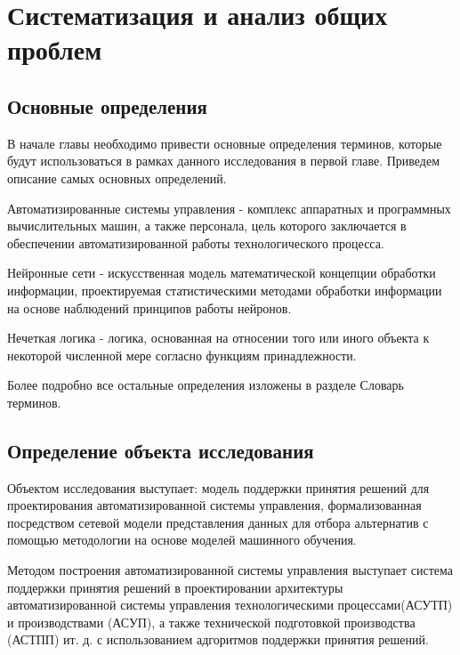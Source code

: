 \chapter{Систематизация и анализ общих проблем}\label{ch:ch1}

\section{Основные определения}\label{sec:ch1/sec1}

В начале главы необходимо привести основные определения терминов, которые будут использоваться в рамках данного исследования в первой главе. Приведем описание самых основных определений.

Автоматизированные системы управления - комплекс аппаратных и программных вычислительных машин, а также персонала, цель которого заключается в обеспечении автоматизированной работы технологического процесса.

Нейронные сети - искусственная модель математической концепции обработки информации, проектируемая статистическими методами обработки информации на основе наблюдений принципов работы нейронов.

Нечеткая логика - логика, основанная на относении того или иного объекта к некоторой численной мере согласно функциям принадлежности.

Более подробно все остальные определения изложены в разделе Словарь терминов.

\section{Определение объекта исследования}\label{sec:ch1/sec2}
Объектом исследования выступает: модель поддержки принятия решений для проектирования автоматизированной системы управления, формализованная посредством сетевой модели представления данных для отбора альтернатив с помощью методологии на основе моделей машинного обучения.

Методом построения автоматизированной системы управления выступает система поддержки принятия решений в проектировании архитектуры автоматизированной системы управления технологическими процессами(АСУТП) и производствами (АСУП), а также технической подготовкой производства (АСТПП) ит. д. с использованием адгоритмов поддержки принятия решений.

